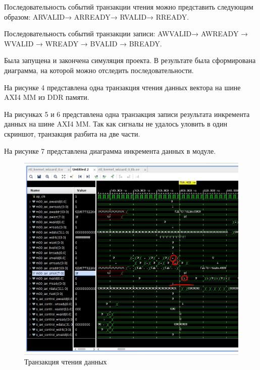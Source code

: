 Последовательность событий транзакции чтения можно представить следующим образом: ARVALID→ ARREADY→ RVALID→ RREADY.

Последовательность событий транзакции записи: AWVALID→ AWREADY → WVALID → WREADY → BVALID → BREADY.

Была запущена и закончена симуляция проекта.
В результате была сформирована диаграмма, на которой можно отследить последовательности.

На рисунке 4 представлена одна транзакция чтения данных вектора на шине AXI4 MM из DDR памяти.

На рисунках 5 и 6 представлена одна транзакция записи результата инкремента данных на шине AXI4 MM. Так как сигналы не удалось уловить в один скриншот, транзакция разбита на две части.

На рисунке 7 представлена диаграмма инкремента данных в модуле.

\FloatBarrier
\begin{figure}[h]
	\begin{center}
		\includegraphics[width=\linewidth]{inc/read_original.png}
	\end{center}
	\caption{Транзакция чтения данных}
\end{figure}
\FloatBarrier

